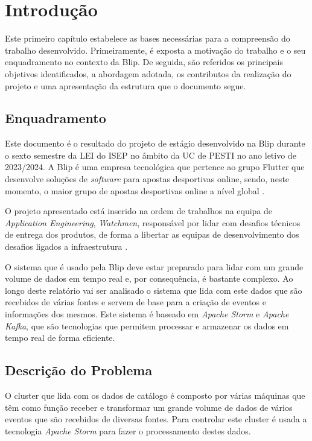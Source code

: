 \chapter{Introdução} 	
\label{sec:1-Introducao}

Este primeiro capítulo estabelece as bases necessárias para a compreensão do trabalho desenvolvido. 
Primeiramente, é exposta a motivação do trabalho e o seu enquadramento no contexto da Blip. 
De seguida, são referidos os principais objetivos identificados, a abordagem adotada, os contributos 
da realização do projeto e uma apresentação da estrutura que o documento segue.

\section{Enquadramento}

Este documento é o resultado do projeto de estágio desenvolvido na Blip durante o sexto semestre 
da \ac{LEI} do \ac{ISEP} no âmbito da \ac{UC} de \ac{PESTI} no ano letivo de 2023/2024. A Blip é 
uma empresa tecnológica que pertence ao grupo Flutter que desenvolve soluções de \textit{software} 
para apostas desportivas online, sendo, neste momento, o maior grupo de apostas desportivas online 
a nível global \cite{blip}.

O projeto apresentado está inserido na ordem de trabalhos na equipa de \textit{Application Engineering},
\textit{Watchmen}, responsável por lidar com desafios técnicos de entrega dos produtos, de forma
a libertar as equipas de desenvolvimento dos desafios ligados a infraestrutura \cite{blip-jobs}.

O sistema que é usado pela Blip deve estar preparado para lidar com um grande volume de dados em 
tempo real e, por consequência, é bastante complexo. Ao longo deste relatório vai ser analisado 
o sistema que lida com este dados que são recebidos de várias fontes e servem de base para a criação 
de eventos e informações dos mesmos. Este sistema é baseado em \textit{Apache Storm} e 
\textit{Apache Kafka}, que são tecnologias que permitem processar e armazenar os dados em tempo 
real de forma eficiente.

\section{Descrição do Problema}

O \gls{cluster} que lida com os dados de catálogo é composto por várias máquinas que têm
como função receber e transformar um grande volume de dados de vários eventos que são recebidos de 
diversas fontes. Para controlar este \gls{cluster} é usada a tecnologia \textit{Apache Storm}
para fazer o processamento destes dados.

